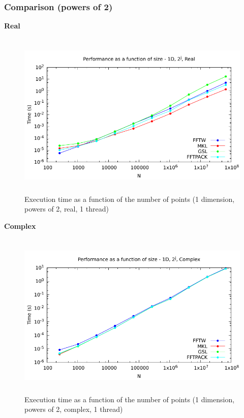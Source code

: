 \documentclass[12pt, a4paper]{article}
\begin{document}
\subsubsection{Comparison (powers of 2)}
{\bf Real}
\begin{figure}[H]
\captionsetup{width=0.6\textwidth}
\centering
\includegraphics[height=8cm]{graphs/performance/1d-pow2-r.pdf}
\caption{Execution time as a function of the number of points (1 dimension, powers of 2, real, 1 thread)}
\label{1DPOW2R}
\end{figure}
{\bf Complex}
\begin{figure}[H]
\captionsetup{width=0.6\textwidth}
\centering
\includegraphics[height=8cm]{graphs/performance/1d-pow2-c.pdf}
\caption{Execution time as a function of the number of points (1 dimension, powers of 2, complex, 1 thread)}
\label{1DPOW2C}
\end{figure}
\end{document}
